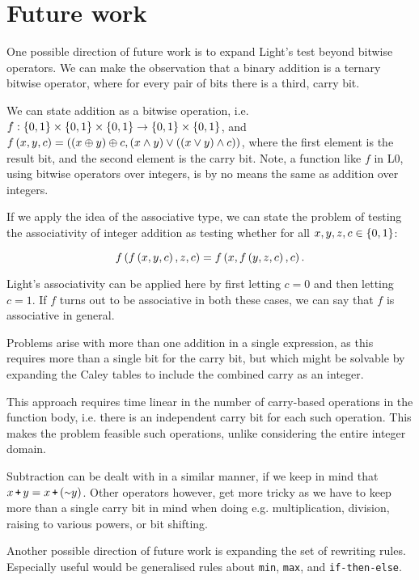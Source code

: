 \section{Future work}

One possible direction of future work is to expand Light's test beyond bitwise
operators. We can make the observation that a binary addition is a ternary
bitwise operator, where for every pair of bits there is a third, carry bit.

We can state addition as a bitwise operation, i.e. $f : \left\{{0,1}\right\} \times
\left\{{0,1}\right\} \times \left\{{0,1}\right\} \rightarrow \left\{{0,1}\right\} \times \left\{{0,1}\right\}$, and
$f\left({x,y,c}\right)=\left({\left({x \oplus y}\right) \oplus c, \left({x \wedge y}\right) \vee \left({ \left({ x \vee y}\right)
\wedge c}\right)}\right)$, where the first element is the result bit, and the second element
is the carry bit. Note, a function like $f$ in L0, using bitwise operators over
integers, is by no means the same as addition over integers.

If we apply the idea of the associative type, we can state the problem of
testing the associativity of integer addition as testing whether for all
$x,y,z,c\in \left\{{0,1}\right\}$:

\[f\left({f\left({x,y,c}\right), z,c}\right) = f\left({x, f\left({y,z,c}\right),c}\right).\]

Light's associativity can be applied here by first letting $c=0$ and then
letting $c=1$. If $f$ turns out to be associative in both these cases, we can
say that $f$ is associative in general. 

Problems arise with more than one addition in a single expression, as this requires more
than a single bit for the carry bit, but which might be solvable by expanding the Caley
tables to include the combined carry as an integer.

This approach requires time linear in the number of carry-based operations in
the function body, i.e. there is an independent carry bit for each such
operation. This makes the problem feasible such operations, unlike considering
the entire integer domain.

Subtraction can be dealt with in a similar manner, if we keep in mind that
$x\lp y=x \lp(\lneg y)$. Other operators however, get more tricky as we have to
keep more than a single carry bit in mind when doing e.g. multiplication,
division, raising to various powers, or bit shifting.

Another possible direction of future work is expanding the set of rewriting
rules. Especially useful would be generalised rules about \texttt{min},
\texttt{max}, and \texttt{if-then-else}.

